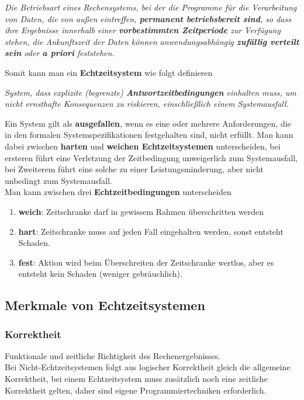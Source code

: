 \documentclass[a4paper, 10 pt, conference]{ieeeconf}
\begin{document}
\begin{center}
\textit{Die Betriebsart eines Rechensystems, bei der die Programme für die Verarbeitung von Daten, die von außen eintreffen, \textbf{permanent betriebsbereit sind}, so dass ihre Ergebnisse innerhalb einer \textbf{vorbestimmten Zeitperiode} zur Verfügung stehen, die Ankunftszeit der Daten können anwendungsabhängig \textbf{zufällig verteilt sein} oder \textbf{a priori} feststehen.}
\end{center} 

Somit kann man ein \textbf{Echtzeitsystem} wie folgt definieren

\begin{center}
\textit{System, dass explizite (begrenzte) \textbf{Antwortzeitbedingungen} einhalten muss, um nicht ernsthafte Konsequenzen zu riskieren, einschließlich einem Systemausfall.} 
\end{center}

Ein System gilt als \textbf{ausgefallen}, wenn es eine oder mehrere Anforderungen, die in den formalen Systemspezifikationen festgehalten sind, nicht erfüllt. Man kann dabei zwischen \textbf{harten} und \textbf{weichen Echtzeitsystemen} unterscheiden, bei ersteren führt 	eine Verletzung der Zeitbedingung unweigerlich zum Systemausfall, bei Zweiterem führt eine solche zu einer Leistungsminderung, aber nicht unbedingt zum Systemausfall. \\
\pagebreak
Man kann zwischen drei \textbf{Echtzeitbedingungen} unterscheiden
\begin{enumerate}
\item \textbf{weich}: Zeitschranke darf in gewissem Rahmen überschritten werden
\item \textbf{hart}: Zeitschranke muss auf jeden Fall eingehalten werden, sonst entsteht Schaden. 
\item \textbf{fest}: Aktion wird beim Überschreiten der Zeitschranke wertlos, aber es entsteht kein Schaden (weniger gebräuchlich).
\end{enumerate}

\subsection*{\textbf{Merkmale von Echtzeitsystemen}}
\subsubsection*{\textbf{Korrektheit}}
Funktionale und zeitliche Richtigkeit des Rechenergebnisses. \\
Bei Nicht-Echtzeitsystemen folgt aus logischer Korrektheit gleich die allgemeine Korrektheit, bei einem Echtzeitsystem muss zusätzlich noch eine zeitliche Korrektheit gelten, daher sind eigene Programmiertechniken erforderlich.
\end{document}
